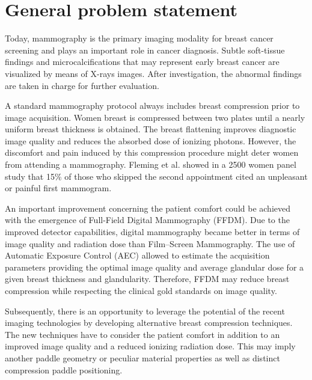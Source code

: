 \chapter*{General problem statement}
\label{section:generalproblemstatment}

Today, mammography is the primary imaging modality for breast cancer screening and plays an important role in cancer diagnosis. Subtle soft-tissue findings and microcalcifications that may represent early breast cancer are visualized by means of X-rays images. After investigation, the abnormal findings are taken in charge for further evaluation.  

A standard mammography protocol always includes breast compression prior to image acquisition. Women breast is compressed between two plates until a nearly uniform breast thickness is obtained. The breast flattening improves diagnostic image quality and reduces the absorbed dose of ionizing photons. However, the discomfort and pain induced by this compression procedure might deter women from attending a mammography. Fleming et al. \citep{fleming_intermittent_2013} showed in a 2500 women panel study that 15\% of those who skipped the second appointment cited an unpleasant or painful first mammogram.  

An important improvement concerning the patient comfort could be achieved with the emergence of Full-Field Digital Mammography (FFDM). Due to the improved detector capabilities, digital mammography became better in terms of image quality and radiation dose than Film–Screen Mammography. The use of Automatic Exposure Control (AEC) allowed to estimate the acquisition parameters providing the optimal image quality and average glandular dose for a given breast thickness and glandularity. Therefore, FFDM may reduce breast compression while respecting the clinical gold standards on image quality.

Subsequently, there is an opportunity to leverage the potential of the recent imaging technologies by developing alternative breast compression techniques. The new techniques have to consider the patient comfort in addition to an improved image quality and a reduced ionizing radiation dose. This may imply another paddle geometry or peculiar material properties as well as distinct compression paddle positioning.

